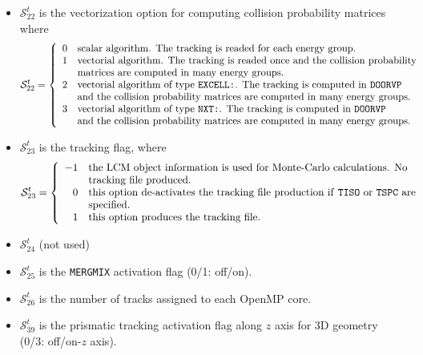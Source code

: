 \begin{itemize}
\item $\mathcal{S}^{t}_{22}$ is the vectorization option for computing collision probability matrices where
\begin{displaymath}
\mathcal{S}^{t}_{22} = \left\{
\begin{array}{rl}
 0 & \textrm{scalar algorithm. The tracking is readed for each energy group.} \\
 1 & \textrm{vectorial algorithm. The tracking is readed once and the collision
 probability} \\
   & \textrm{matrices are computed in many energy groups.} \\
 2 & \textrm{vectorial algorithm of type \moc{EXCELL:}. The tracking is computed in \moc{DOORVP}} \\
   & \textrm{and the collision probability matrices are computed in many energy groups.} \\
 3 & \textrm{vectorial algorithm of type \moc{NXT:}. The tracking is computed in \moc{DOORVP}} \\
   & \textrm{and the collision probability matrices are computed in many energy groups.} \\
\end{array} \right.
\end{displaymath}

\item $\mathcal{S}^{t}_{23}$ is the tracking flag, where
\begin{displaymath}
\mathcal{S}^{t}_{23} = \left\{
\begin{array}{rl}
 -1 & \textrm{the LCM object information is used for Monte-Carlo calculations. No} \\
   & \textrm{tracking file produced.} \\
 0 & \textrm{this option de-activates the tracking file production if \moc{TISO} or \moc{TSPC} are} \\
   & \textrm{specified.} \\
 1 & \textrm{this option produces the tracking file.} \\
\end{array} \right.
\end{displaymath}

\item $\mathcal{S}^{t}_{24}$ (not used)

\item $\mathcal{S}^{t}_{25}$ is the {\tt MERGMIX} activation flag (0/1: off/on).

\item $\mathcal{S}^{t}_{26}$ is the number of tracks assigned to each OpenMP core.

\item $\mathcal{S}^{t}_{39}$ is the prismatic tracking activation flag along $z$ axis for 3D geometry (0/3: off/on-$z$ axis).

\end{itemize}

